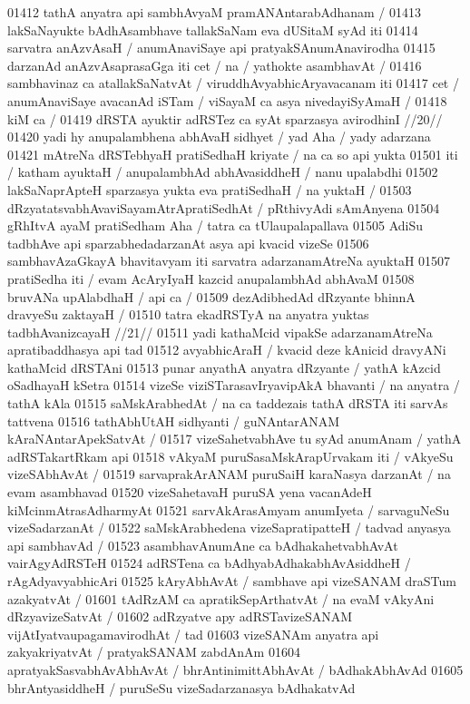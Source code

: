 01412 	tathA anyatra api sambhAvyaM pramANAntarabAdhanam /  
01413 lakSaNayukte bAdhAsambhave tallakSaNam eva dUSitaM syAd iti 
01414 sarvatra anAzvAsaH / anumAnaviSaye api pratyakSAnumAnavirodha 
01415 darzanAd anAzvAsaprasaGga iti cet / na / yathokte asambhavAt / 
01416 sambhavinaz ca atallakSaNatvAt / viruddhAvyabhicAryavacanam iti
01417 cet / anumAnaviSaye avacanAd iSTam / viSayaM ca asya  nivedayiSyAmaH /
01418 kiM ca /
01419 	dRSTA ayuktir adRSTez ca syAt sparzasya avirodhinI //20//
01420 yadi hy anupalambhena abhAvaH sidhyet / yad Aha / yady adarzana  
01421 mAtreNa dRSTebhyaH pratiSedhaH kriyate / na ca so api yukta  
01501 iti / katham ayuktaH / anupalambhAd abhAvasiddheH / nanu upalabdhi 
01502 lakSaNaprApteH sparzasya yukta eva pratiSedhaH / na yuktaH /
01503 dRzyatatsvabhAvaviSayamAtrApratiSedhAt / pRthivyAdi sAmAnyena
01504 gRhItvA ayaM pratiSedham Aha / tatra ca tUlaupalapallava  
01505 AdiSu tadbhAve api sparzabhedadarzanAt asya api kvacid vizeSe 
01506 sambhavAzaGkayA bhavitavyam iti sarvatra adarzanamAtreNa ayuktaH 
01507 pratiSedha iti / evam AcAryIyaH kazcid anupalambhAd abhAvaM 
01508 bruvANa upAlabdhaH / api ca / 
01509 	dezAdibhedAd dRzyante bhinnA dravyeSu zaktayaH /
01510 	tatra ekadRSTyA na anyatra yuktas tadbhAvanizcayaH //21// 
01511 yadi kathaMcid vipakSe adarzanamAtreNa apratibaddhasya api tad
01512 avyabhicAraH / kvacid deze kAnicid dravyANi kathaMcid dRSTAni
01513 punar anyathA anyatra dRzyante / yathA kAzcid oSadhayaH kSetra  
01514 vizeSe viziSTarasavIryavipAkA bhavanti / na anyatra / tathA kAla 
01515 saMskArabhedAt / na ca taddezais tathA dRSTA iti sarvAs tattvena
01516 tathAbhUtAH sidhyanti / guNAntarANAM kAraNAntarApekSatvAt /  
01517 vizeSahetvabhAve tu syAd anumAnam / yathA adRSTakartRkam api 
01518 vAkyaM puruSasaMskArapUrvakam iti / vAkyeSu vizeSAbhAvAt /
01519 sarvaprakArANAM puruSaiH karaNasya darzanAt /  na evam asambhavad
01520 vizeSahetavaH puruSA yena vacanAdeH kiMcinmAtrasAdharmyAt 
01521 sarvAkArasAmyam anumIyeta / sarvaguNeSu vizeSadarzanAt /  
01522 saMskArabhedena vizeSapratipatteH / tadvad anyasya api  sambhavAd /
01523 asambhavAnumAne ca bAdhakahetvabhAvAt vairAgyAdRSTeH  
01524 adRSTena ca bAdhyabAdhakabhAvAsiddheH / rAgAdyavyabhicAri  
01525 kAryAbhAvAt / sambhave api vizeSANAM draSTum azakyatvAt /
01601 tAdRzAM ca apratikSepArthatvAt / na evaM vAkyAni dRzyavizeSatvAt /
01602 adRzyatve apy adRSTavizeSANAM vijAtIyatvaupagamavirodhAt / tad
01603 vizeSANAm anyatra api zakyakriyatvAt / pratyakSANAM zabdAnAm
01604 apratyakSasvabhAvAbhAvAt / bhrAntinimittAbhAvAt / bAdhakAbhAvAd
01605 bhrAntyasiddheH / puruSeSu vizeSadarzanasya bAdhakatvAd  
